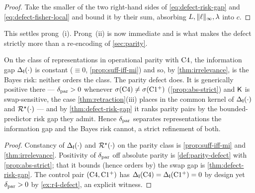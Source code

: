 \begin{proof}
Take the smaller of the two right-hand sides of \eqref{eq:defect-risk-gap} and
\eqref{eq:defect-fisher-local} and bound it by their sum, absorbing
$L,\|\ell\|_\infty,\lambda$ into $c$.
\end{proof}

This settles prong~(i). Prong~(ii) is now immediate and is what makes the defect
strictly more than a re-encoding of \cref{sec:parity}.

\begin{corollary}
\label{cor:defect-finer-order}
On the class of representations in operational parity with $\mathrm{C}4$, the
information gap $\Delta_{\mathsf{I}}\!\left(\cdot\right)$ is constant ($\equiv 0$,
\cref{prop:suff-iff-mi}) and so, by \cref{thm:irrelevance}, is the Bayes risk:
neither orders the class. The parity defect does. It is generically positive
there --- $\delta_{\mathrm{par}}>0$ whenever $\sigma\!\left(\mathrm{C}4\right)\ne\sigma\!\left(\mathrm{C1^{+}}\right)$
(\cref{prop:abs-strict}) and $\mathsf{K}$ is swap-sensitive, the case
\cref{thm:retraction}(iii) places in the common kernel of $\Delta_{\mathsf{I}}\!\left(\cdot\right)$ and
$\mathcal{R}^{\star}(\cdot)$ --- and by \cref{thm:defect-risk-gap} it ranks parity pairs by
the bounded-predictor risk gap they admit. Hence $\delta_{\mathrm{par}}$ separates
representations the information gap and the Bayes risk cannot, a strict
refinement of both.
\end{corollary}

\begin{proof}
Constancy of $\Delta_{\mathsf{I}}\!\left(\cdot\right)$ and $\mathcal{R}^{\star}(\cdot)$ on the parity class is
\cref{prop:suff-iff-mi} and \cref{thm:irrelevance}. Positivity of
$\delta_{\mathrm{par}}$ off absolute parity is \cref{def:parity-defect} with
\cref{prop:abs-strict}; that it bounds (hence orders by) the swap gap is
\cref{thm:defect-risk-gap}. The control pair
$(\mathrm{C}4,\mathrm{C1^{+}})$ has $\Delta_{\mathsf{I}}\!\left(\mathrm{C}4\right)=\Delta_{\mathsf{I}}\!\left(\mathrm{C1^{+}}\right)=0$ by
design yet $\delta_{\mathrm{par}}>0$ by \cref{ex:r4-defect}, an explicit witness.
\end{proof}

